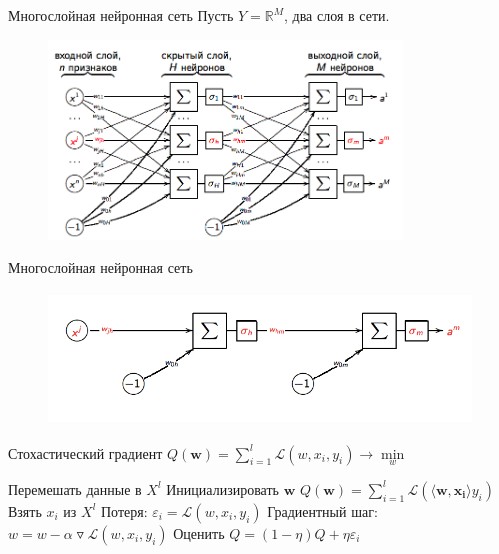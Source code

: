 \documentclass[10pt]{beamer}
\begin{document}

\begin{frame}{Многослойная нейронная сеть}
	Пусть $Y = \mathbb{R}^M$, два слоя в сети.\\
	
	\begin{figure}[htbp]
	  \includegraphics[height=150pt, keepaspectratio = true]{images/neural_network}   
	\end{figure}
\end{frame}

\begin{frame}{Многослойная нейронная сеть}
	\begin{figure}[htbp]
	  \includegraphics[height=100pt, keepaspectratio = true]{images/neural_network1}   
	\end{figure}
\end{frame}

\begin{frame}{Стохастический градиент}
  ${Q}(\mathbf{w}) = \sum\limits_{i=1}^l \mathcal{L}(w, x_i, y_i) \rightarrow \min\limits_w$ \\
  \bigbreak
  \begin{algorithmic}[1]
     \State Перемешать данные в $X^l$
     \State Инициализировать $\mathbf{w}$
     \State ${Q}(\mathbf{w}) = \sum\limits_{i=1}^l \mathcal{L}(\langle \mathbf{w}, \mathbf{x_i} \rangle y_i)$
       \State Взять $x_i$ из $X^l$
       \State Потеря: $\varepsilon_i = \mathcal{L}(w, x_i, y_i)$
       \State Градиентный шаг: $w =  w - \alpha \triangledown \mathcal{L}(w, x_i, y_i)$
       \State Оценить $Q = (1-\eta)Q + \eta \varepsilon_i$
     \EndRepeat
    \EndFunction
  \end{algorithmic}  
\end{frame}
\end{document}
